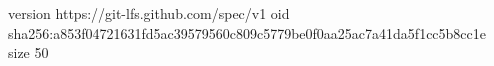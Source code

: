 version https://git-lfs.github.com/spec/v1
oid sha256:a853f04721631fd5ac39579560c809c5779be0f0aa25ac7a41da5f1cc5b8cc1e
size 50
